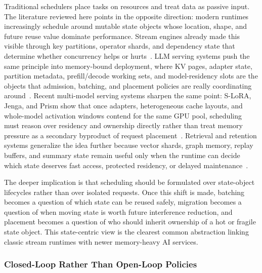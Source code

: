 \documentclass[acmsmall,screen,review]{acmart}
\begin{document}
Traditional schedulers place tasks on resources and treat data as passive input. The literature reviewed here points in the opposite direction: modern runtimes increasingly schedule around mutable state objects whose location, shape, and future reuse value dominate performance. Stream engines already made this visible through key partitions, operator shards, and dependency state that determine whether concurrency helps or hurts~\cite{zhang2019briskstream,mao2023morphstream}. LLM serving systems push the same principle into memory-bound deployment, where KV pages, adapter state, partition metadata, prefill/decode working sets, and model-residency slots are the objects that admission, batching, and placement policies are really coordinating around~\cite{kwon2023pagedattention,agrawal2024sarathi,chen2024punica,li2023alpaserve}. Recent multi-model serving systems sharpen the same point: S-LoRA, Jenga, and Prism show that once adapters, heterogeneous cache layouts, and whole-model activation windows contend for the same GPU pool, scheduling must reason over residency and ownership directly rather than treat memory pressure as a secondary byproduct of request placement~\cite{sheng2023slora,zhang2025jenga,yu2025prism}. Retrieval and retention systems generalize the idea further because vector shards, graph memory, replay buffers, and summary state remain useful only when the runtime can decide which state deserves fast access, protected residency, or delayed maintenance~\cite{wang2024hipporag,zhang2026flowrag,li2026streamfp}.

The deeper implication is that scheduling should be formulated over state-object lifecycles rather than over isolated requests. Once this shift is made, batching becomes a question of which state can be reused safely, migration becomes a question of when moving state is worth future interference reduction, and placement becomes a question of who should inherit ownership of a hot or fragile state object. This state-centric view is the clearest common abstraction linking classic stream runtimes with newer memory-heavy AI services.

\subsubsection{Closed-Loop Rather Than Open-Loop Policies}
\end{document}
